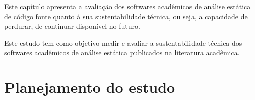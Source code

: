 {Este capítulo apresenta a avaliação dos softwares acadêmicos de análise
estática de código fonte quanto à sua sustentabilidade técnica, ou seja, a
capacidade de perdurar, de continuar disponível no futuro.}
\label{sustentabilidade-tecnica}


%

Este estudo tem como objetivo medir e avaliar a sustentabilidade técnica dos
softwares acadêmicos de análise estática publicados na literatura acadêmica.


\section{Planejamento do estudo}


